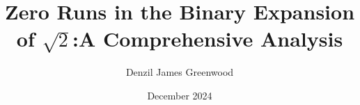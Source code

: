 
\title{\centering Zero Runs in the Binary Expansion of $\sqrt{2}$:\newline \centering A Comprehensive Analysis}
\author{Denzil James Greenwood}
\date{December 2024}



\maketitle

% 











\newpage
{} 
\label{sec:python_code, Zero Run Analysis Algorithm}




